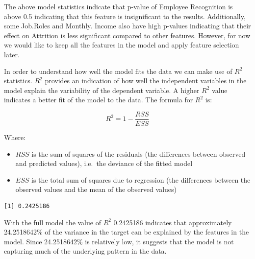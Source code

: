 \documentclass[
  10pt,
  paper=a4,
  ,captions=tableheading
]{scrartcl}
\newenvironment{Shaded}{\begin{snugshade}}{\end{snugshade}}
\newcommand{\DecValTok}[1]{\textcolor[rgb]{0.00,0.00,0.81}{#1}}
\newcommand{\FunctionTok}[1]{\textcolor[rgb]{0.13,0.29,0.53}{\textbf{#1}}}
\newcommand{\NormalTok}[1]{#1}
\newcommand{\OtherTok}[1]{\textcolor[rgb]{0.56,0.35,0.01}{#1}}
\newcommand{\SpecialCharTok}[1]{\textcolor[rgb]{0.81,0.36,0.00}{\textbf{#1}}}
\providecommand{\tightlist}{%
  \setlength{\itemsep}{0pt}\setlength{\parskip}{0pt}}
\begin{document}
\small

The above model statistics indicate that p-value of Employee Recognition
is above 0.5 indicating that this feature is insignificant to the
results. Additionally, some Job.Roles and Monthly. Income also have high
p-values indicating that their effect on Attrition is less significant
compared to other features. However, for now we would like to keep all
the features in the model and apply feature selection later.

In order to understand how well the model fits the data we can make use
of \(R^2\) statistics. \(R^2\) provides an indication of how well the
independent variables in the model explain the variability of the
dependent variable. A higher \(R^2\) value indicates a better fit of the
model to the data. The formula for \(R^2\) is:

\[ R^2 = 1 - \frac{RSS}{ESS} \]

Where:

\begin{itemize}
\tightlist
\item
  \({RSS}\) is the sum of squares of the residuals (the differences
  between observed and predicted values), i.e.~the deviance of the
  fitted model
\item
  \({ESS}\) is the total sum of squares due to regression (the
  differences between the observed values and the mean of the observed
  values)
\end{itemize}

\small

\begin{Shaded}
\end{Shaded}

\begin{verbatim}
[1] 0.2425186
\end{verbatim}

\small

With the full model the value of \(R^2\) 0.2425186 indicates that
approximately 24.2518642\% of the variance in the target can be
explained by the features in the model. Since 24.2518642\% is relatively
low, it suggests that the model is not capturing much of the underlying
pattern in the data.
\end{document}
